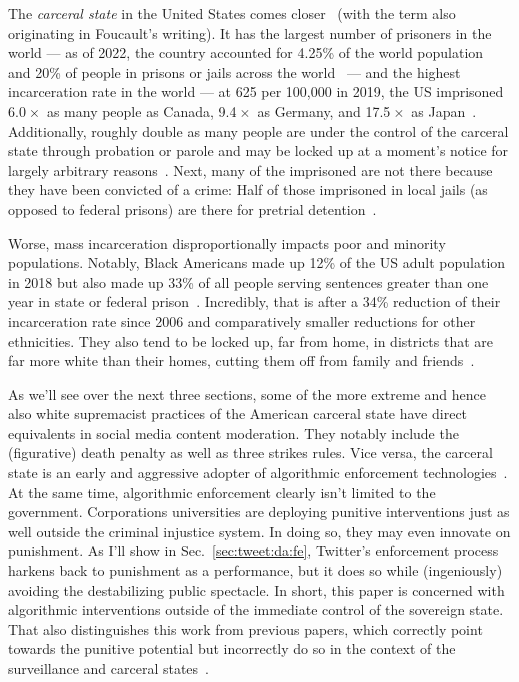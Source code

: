 The \emph{carceral state} in the United States comes closer~\cite{Simon2007}
(with the term also originating in Foucault's writing). It has the largest
number of prisoners in the world — as of 2022, the country accounted for 4.25\%
of the world population~\cite{Worldometer2023} and 20\% of people in prisons or
jails across the world~\cite{SawyerWagner2022} — and the highest incarceration
rate in the world — at 625 per 100,000 in 2019, the US imprisoned
6.0$\mspace{1mu}\times$ as many people as Canada, 9.4$\mspace{1mu}\times$ as
Germany, and 17.5$\mspace{1mu}\times$ as Japan~\cite{WorldPrisonBrief2023}.
Additionally, roughly double as many people are under the control of the
carceral state through probation or parole and may be locked up at a moment's
notice for largely arbitrary reasons~\cite{SawyerWagner2022}. Next, many of the
imprisoned are not there because they have been convicted of a crime: Half of
those imprisoned in local jails (as opposed to federal prisons) are there for
pretrial detention~\cite{SawyerWagner2022}.

Worse, mass incarceration disproportionally impacts poor and minority
populations. Notably, Black Americans made up 12\% of the US adult population in
2018 but also made up 33\% of all people serving sentences greater than one year
in state or federal prison~\cite{Gramlich2020}. Incredibly, that is after a 34\%
reduction of their incarceration rate since 2006 and comparatively smaller
reductions for other ethnicities. They also tend to be locked up, far from home,
in districts that are far more white than their homes, cutting them off from
family and friends~\cite{WagnerKopf2015}.

As we'll see over the next three sections, some of the more extreme and hence
also white supremacist practices of the American carceral state have direct
equivalents in social media content moderation. They notably include the
(figurative) death penalty as well as three strikes rules. Vice versa, the
carceral state is an early and aggressive adopter of algorithmic enforcement
technologies~\cite{AngwinLarsonea2016,EPIC2020,Hao2019,ReddenODonovanDixea2020,Yampolskiy2016}.
At the same time, algorithmic enforcement clearly isn't limited to the
government. Corporations universities are deploying punitive interventions just
as well outside the criminal injustice system. In doing so, they may even
innovate on punishment. As I'll show in Sec.~\ref{sec:tweet:da:fe}, Twitter's
enforcement process harkens back to punishment as a performance, but it does so
while (ingeniously) avoiding the destabilizing public spectacle. In short, this
paper is concerned with algorithmic interventions outside of the immediate
control of the sovereign state. That also distinguishes this work from previous
papers, which correctly point towards the punitive potential but incorrectly do
so in the context of the surveillance and carceral
states~\cite{DehlendorfGerety2021,McElroyWhittakerea2021}.

